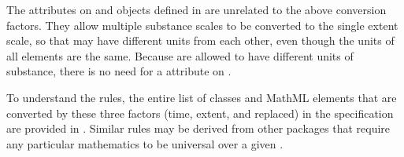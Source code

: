The  attributes on \Species and \Model objects defined
in \sbmlthreecore are unrelated to the above conversion factors.  They
allow multiple substance scales to be converted to the single extent scale, so that
\Species may have different units from each other, even though the units of all
\KineticLaw elements are the same.  Because \Species are allowed to have different
units of substance, there is no need for a 
attribute on \Submodel.

To understand the rules, the entire list of classes and MathML elements
that are converted by these three factors (time, extent, and
replaced) in the \sbmlthreecore specification are provided
in .  Similar rules may be derived from other
packages that require any particular mathematics to be universal over 
a given \Model.

\newcommand{\sprd}[2]{\raisebox{-#1pt}[0pt][(#1pt * 2) + 4pt]{#2}}
\newcommand{\persymb}{\emph{Conversion factor for referenced object}}

